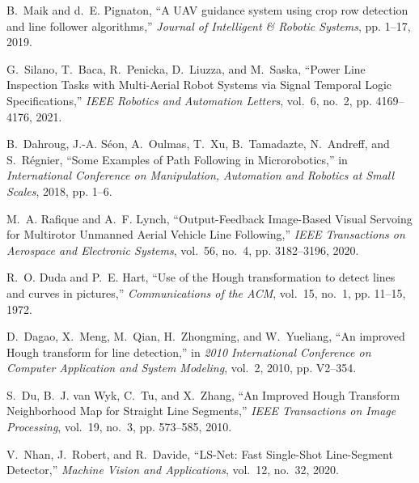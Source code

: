 \documentclass[a4paper,twocolumn,10pt]{article}
\begin{document}
    
    \footnotesize\begin{thebibliography}{10}
        B.~Maik and d.~E. Pignaton, ``{A UAV guidance system using crop row detection
        and line follower algorithms},'' \emph{Journal of Intelligent \& Robotic
        Systems}, pp. 1--17, 2019.

        G.~{Silano}, T.~{Baca}, R.~{Penicka}, D.~{Liuzza}, and M.~{Saska}, ``{Power
        Line Inspection Tasks with Multi-Aerial Robot Systems via Signal Temporal
        Logic Specifications},'' \emph{IEEE Robotics and Automation Letters}, vol.~6,
        no.~2, pp. 4169--4176, 2021.

        B.~Dahroug, J.-A. Séon, A.~Oulmas, T.~Xu, B.~Tamadazte, N.~Andreff, and
        S.~Régnier, ``{Some Examples of Path Following in Microrobotics},'' in
        \emph{International Conference on Manipulation, Automation and Robotics at
        Small Scales}, 2018, pp. 1--6.

        M.~A. Rafique and A.~F. Lynch, ``{Output-Feedback Image-Based Visual Servoing
        for Multirotor Unmanned Aerial Vehicle Line Following},'' \emph{IEEE
        Transactions on Aerospace and Electronic Systems}, vol.~56, no.~4, pp.
        3182--3196, 2020.

        R.~O. {Duda} and P.~E. {Hart}, ``{Use of the Hough transformation to detect
        lines and curves in pictures},'' \emph{{Communications of the ACM}}, vol.~15,
        no.~1, pp. 11--15, 1972.

        D.~Dagao, X.~Meng, M.~Qian, H.~Zhongming, and W.~Yueliang, ``{An improved Hough
        transform for line detection},'' in \emph{2010 International Conference on
        Computer Application and System Modeling}, vol.~2, 2010, pp. V2--354.

        S.~{Du}, B.~J. {van Wyk}, C.~{Tu}, and X.~{Zhang}, ``{An Improved Hough
        Transform Neighborhood Map for Straight Line Segments},'' \emph{IEEE
        Transactions on Image Processing}, vol.~19, no.~3, pp. 573--585, 2010.

        V.~Nhan, J.~Robert, and R.~Davide, ``{LS-Net: Fast Single-Shot Line-Segment
        Detector},'' \emph{Machine Vision and Applications}, vol.~12, no.~32, 2020.


\end{thebibliography}
\end{document}
